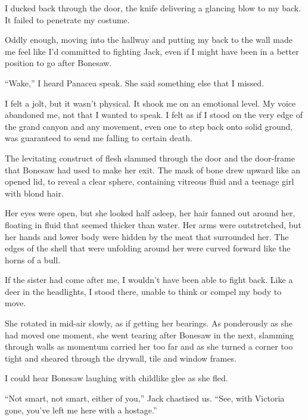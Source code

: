 I ducked back through the door, the knife delivering a glancing blow to my back.  It failed to penetrate my costume.



Oddly enough, moving into the hallway and putting my back to the wall made me feel like I'd committed to fighting Jack, even if I might have been in a better position to go after Bonesaw.



``Wake,'' I heard Panacea speak.  She said something else that I missed.



I felt a jolt, but it wasn't physical.  It shook me on an emotional level.  My voice abandoned me, not that I wanted to speak.  I felt as if I stood on the very edge of the grand canyon and any movement, even one to step back onto solid ground, was guaranteed to send me falling to certain death.



The levitating construct of flesh slammed through the door and the door-frame that Bonesaw had used to make her exit.  The mask of bone drew upward like an opened lid, to reveal a clear sphere, containing vitreous fluid and a teenage girl with blond hair.



Her eyes were open, but she looked half asleep, her hair fanned out around her, floating in fluid that seemed thicker than water.  Her arms were outstretched, but her hands and lower body were hidden by the meat that surrounded her.  The edges of the shell that were unfolding around her were curved forward like the horns of a bull.



If the sister had come after me, I wouldn't have been able to fight back.  Like a deer in the headlights, I stood there, unable to think or compel my body to move.



She rotated in mid-air slowly, as if getting her bearings.  As ponderously as she had moved one moment, she went tearing after Bonesaw in the next, slamming through walls as momentum carried her too far and as she turned a corner too tight and sheared through the drywall, tile and window frames.



I could hear Bonesaw laughing with childlike glee as she fled.



``Not smart, not smart, either of you,'' Jack chastised us.  ``See, with Victoria gone, you've left me here with a hostage.''



